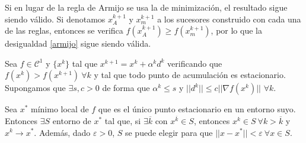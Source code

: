 \documentclass[MIOP.tex]{subfiles}
\begin{document}
\begin{nota}
Si en lugar de la regla de Armijo se usa la de minimización, el resultado sigue siendo válido. Si denotamos $x^{k+1}_A$ y $x^{k+1}_m$ a los sucesores construido con cada una de las reglas, entonces se verifica $f(x^{k+1}_A)\geq f(x^{k+1}_m)$, por lo que la desigualdad \ref{armijo} sigue siendo válida.
\end{nota}

\begin{teorema}[de captura]
Sea $f\in\mathcal{C}^1$ y $\{x^k\}$ tal que $x^{k+1}=x^k+\alpha^k d^k$ verificando que $f(x^k)>f(x^{k+1})\ \forall k$ y tal que todo punto de acumulación es estacionario. Supongamos que $\exists s,c>0$ de forma que $\alpha^k\leq s$ y $||d^k||\leq c||\nabla f(x^k)||$ $\forall k.$

Sea $x^*$ mínimo local de $f$ que es el único punto estacionario en un entorno suyo. Entonces $\exists S$ entorno de $x^*$ tal que, si $\exists \overline{k}$ con $x^{\overline{k}}\in S$, entonces $x^k\in S\ \forall k>\overline{k}$ y $x^k\to x^*$. Además, dado $\varepsilon>0$, $S$ se puede elegir para que $||x-x^*||<\varepsilon \ \forall x\in S$.
\end{teorema}
\end{document}
